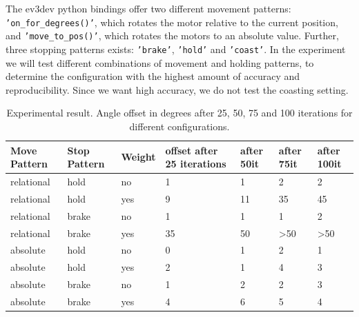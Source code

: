 \documentclass[11pt, a4paper]{article}
\begin{document}
The ev3dev python bindings offer two different movement patterns: \texttt{'on\_for\_degrees()'}, which rotates the motor relative to the current position, and \texttt{'move\_to\_pos()'}, which rotates the motors to an absolute value.  Further, three stopping patterns exists: \texttt{'brake'}, \texttt{'hold'} and \texttt{'coast'}. In the experiment we will test different combinations of movement and holding patterns, to determine the configuration with the highest amount of accuracy and reproducibility. Since we want high accuracy, we do not test the coasting setting. 


\begin{table}[H]
	\centering
	\begin{tabular}{|l|l|l|l|l|l|l|}
		\hline
		Move Pattern & Stop Pattern & Weight & offset after 25 iterations & after 50it & after 75it             & after 100it            \\ \hline \hline
		relational   & hold         & no     & 1             & 1    & 2                & 2                \\ \hline
		relational   & hold         & yes    & 9             & 11   & 35               & 45               \\ \hline
		relational   & brake        & no     & 1             & 1    & 1                & 2                \\ \hline
		relational   & brake        & yes    & 35            & 50   & \textgreater{}50 & \textgreater{}50 \\ \hline
		absolute     & hold         & no     & 0             & 1    & 2                & 1                \\ \hline
		absolute     & hold         & yes    & 2             & 1    & 4                & 3                \\ \hline
		absolute     & brake        & no     & 1             & 2    & 2                & 3                \\ \hline
		absolute     & brake        & yes    & 4             & 6    & 5                & 4                \\ \hline
	\end{tabular}
	\caption{Experimental result. Angle offset in degrees after 25, 50, 75 and 100 iterations for different configurations.}
	\label{tab:angle_experiment}
\end{table}
\end{document}
